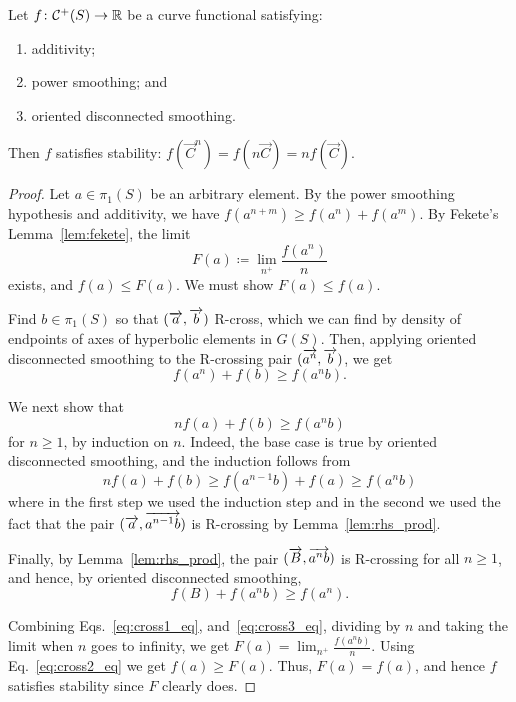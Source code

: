 \begin{proposition}
Let $f \colon \mathcal{C}^+(S) \to \mathbb{R}$ be a curve functional satisfying:
\begin{enumerate}
\item additivity;
\item power smoothing; and
\item oriented disconnected smoothing.
\end{enumerate}
Then $f$ satisfies stability: $f(\vec C^n) = f(n\vec C) = nf(\vec C)$.
\label{prop:power_disconnected_imply_stable}
\end{proposition}
\begin{proof}
  Let $a \in \pi_1(S)$ be an arbitrary element.
  By the power smoothing hypothesis and additivity, we have
  $f(a^{n+m}) \geq f(a^n) + f(a^m)$.
By Fekete's Lemma~\ref{lem:fekete}, the limit
\[
F(a)\coloneqq\lim_{n^+} \frac{f(a^n)}{n}
\]
exists, and $f(a) \leq F(a)$. We must show $F(a) \leq f(a)$.
  
  Find $b \in
\pi_1(S)$ so that $(\overrightarrow{a},\overrightarrow{b})$ R-cross, which we can find by
density of endpoints of axes of hyperbolic elements in $G(S)$.
Then, applying oriented disconnected smoothing to the R-crossing pair $(\overrightarrow{a^n}, \overrightarrow{b})$, we get
\begin{equation}
f(a^n) + f(b) \geq f(a^nb).
\label{eq:cross1_eq}
\end{equation}

We next show that
\begin{equation}
nf(a) + f(b) \geq f(a^nb)
\label{eq:cross2_eq}
\end{equation}
for $n\geq 1$, by induction on $n$.
Indeed, the base case is true by oriented disconnected smoothing, and the
induction follows from
\[
nf(a) + f(b) \geq f(a^{n-1}b) + f(a) \geq f(a^nb)
\]
where in the first step we used the induction step and in the second we used the fact that the pair $(\overrightarrow{a},\overrightarrow{a^{n-1}b})$ is R-crossing by Lemma~\ref{lem:rhs_prod}.

Finally, by Lemma~\ref{lem:rhs_prod}, the pair $(\overrightarrow{B},\overrightarrow{a^nb})$
is R-crossing for all $n \geq 1$, and hence, by oriented disconnected
smoothing,
\begin{equation}
f(B) + f(a^nb) \geq f(a^n).
\label{eq:cross3_eq}
\end{equation}

Combining Eqs.~\eqref{eq:cross1_eq}, and~\eqref{eq:cross3_eq},
dividing by $n$ and taking the limit when $n$ goes to infinity, we get
$F(a)=\lim_{n^+} \frac{f(a^nb)}{n}$. Using Eq.~\eqref{eq:cross2_eq}
we get $f(a) \geq F(a)$. Thus, $F(a)=f(a)$, and hence $f$ satisfies stability since $F$ clearly does.
\end{proof}

